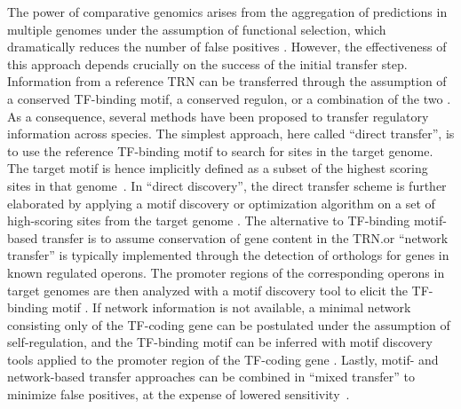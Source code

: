 The power of comparative genomics arises from the aggregation of predictions in
multiple genomes under the assumption of functional selection, which
dramatically reduces the number of false positives
\cite{gelfand2000comparative}. However, the effectiveness of this approach
depends crucially on the success of the initial transfer step. Information from
a reference TRN can be transferred through the assumption of a conserved
TF-binding motif, a conserved regulon, or a combination of the two
\cite{babu2008computational, baumbach2010power}. As a consequence, several
methods have been proposed to transfer regulatory information across
species. The simplest approach, here called “direct transfer”, is to use the
reference TF-binding motif to search for sites in the target genome. The target
motif is hence implicitly defined as a subset of the highest scoring sites in
that genome~\cite{tan2001comparative, makarova2001conservation,
  erill2004differences, rodionov2013transcriptional}. In “direct discovery”,
the direct transfer scheme is further elaborated by applying a motif discovery
or optimization algorithm on a set of high-scoring sites from the target genome
\cite{baumbach2009reliable, habib2012functional}. The alternative to TF-binding
motif-based transfer is to assume conservation of gene content in the
TRN.\@Regulon or “network transfer” is typically implemented through the
detection of orthologs for genes in known regulated operons. The promoter
regions of the corresponding operons in target genomes are then analyzed with a
motif discovery tool to elicit the TF-binding motif
\cite{mccue2001phylogenetic, wang2003combining, panina2003comparative,
  zhang2009genome}. If network information is not available, a minimal network
consisting only of the TF-coding gene can be postulated under the assumption of
self-regulation, and the TF-binding motif can be inferred with motif discovery
tools applied to the promoter region of the TF-coding gene
\cite{francke2008generic, cornish2012inference,
  ravcheev2014comparative}. Lastly, motif- and network-based transfer
approaches can be combined in “mixed transfer” to minimize false positives, at
the expense of lowered sensitivity~\cite{baumbach2010power,
  baumbach2009reliable, yu2004annotation}.

